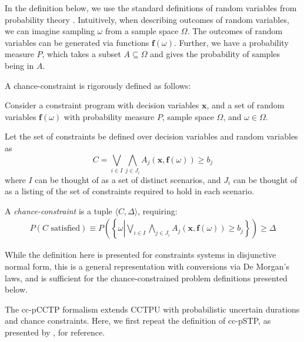 \documentclass[jair,twoside,11pt,theapa]{article}
\begin{document}
In the definition below, we use the standard definitions of random variables
from probability theory \cite{durrett2010probability}. Intuitively, when
describing outcomes of random variables, we can imagine sampling $\omega$ from a
sample space $\Omega$. The outcomes of random variables can be generated via
functions $\mathbf{f}(\omega)$. Further, we have a probability measure $P$,
which takes a subset $A\subseteq \Omega$ and gives the probability of samples
being in $A$.

A chance-constraint is rigorously defined as follows:

\begin{mydef}
Consider a constraint program with decision variables $\mathbf{x}$, and a set of random variables $\mathbf{f}(\omega)$ with probability measure $P$, sample space $\Omega$, and $\omega\in \Omega$. 

Let the set of constraints be defined over decision variables and random variables as 
\[C = \bigvee_{i\in I}\bigwedge_{j\in J_i} A_j(\mathbf{x},\mathbf{f}(\omega))\geq b_j \]
where $I$ can be thought of as a set of distinct scenarios, and $J_i$ can be thought of as a listing of the set of constraints required to hold in each scenario.

A \emph{chance-constraint} is a tuple $\langle C, \Delta\rangle$, requiring:
\begin{align}
P(C\text{ satisfied}) \equiv P\left(\left\{\omega\left|\bigvee_{i\in I}\bigwedge_{j\in J_i} A_j(\mathbf{x},\mathbf{f}(\omega))\geq b_j \right.\right\}\right) \geq \Delta
\end{align}
\label{def:chance-constraint}
\end{mydef}

While the definition here is presented for constraints systems in disjunctive normal form, this is a general representation with conversions via De Morgan's laws, and is sufficient for the chance-constrained problem definitions presented below.

The cc-pCCTP formalism extends CCTPU with probabilistic uncertain durations and chance
constraints. Here, we first repeat the definition of cc-pSTP, as presented by
, for reference.
\end{document}
